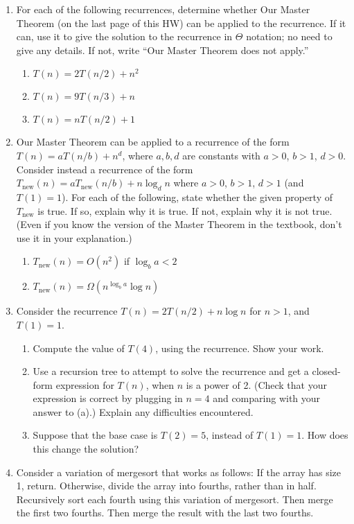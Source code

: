 \documentclass{article}
\begin{document}
\begin{enumerate}
    \item For each of the following recurrences, determine whether Our Master Theorem (on the last page of this HW) can be applied to the recurrence. If it can, use it to give the solution to the recurrence in $\Theta$ notation; no need to give any details. If not, write “Our Master Theorem does not apply.”
    \begin{enumerate}
        \item $T(n) = 2T(n/2) + n^2$
        \item $T(n) = 9T(n/3) + n$
        \item $T(n) = nT(n/2) + 1$
    \end{enumerate}
    \item Our Master Theorem can be applied to a recurrence of the form $T(n) = aT(n/b) + n^d$, where $a, b, d$ are constants with $a > 0$, $b > 1$, $d > 0$. Consider instead a recurrence of the form $T_{\text{new}}(n) = aT_{\text{new}}(n/b) + n \log_d n$ where $a > 0$, $b > 1$, $d > 1$ (and $T(1) = 1$).
    For each of the following, state whether the given property of $T_{\text{new}}$ is true. If so, explain why it is true. If not, explain why it is not true. (Even if you know the version of the Master Theorem in the textbook, don’t use it in your explanation.)
    \begin{enumerate}
        \item $T_{\text{new}}(n) = O(n^2)$ if $\log_b a < 2$
        \item $T_{\text{new}}(n) = \Omega(n^{\log_b a} \log n)$
    \end{enumerate}
    \item Consider the recurrence $T(n) = 2T(n/2) + n \log n$ for $n > 1$, and $T(1) = 1$.
    \begin{enumerate}
        \item Compute the value of $T(4)$, using the recurrence. Show your work.
        \item Use a recursion tree to attempt to solve the recurrence and get a closed-form expression for $T(n)$, when $n$ is a power of 2. (Check that your expression is correct by plugging in $n = 4$ and comparing with your answer to (a).)  Explain any difficulties encountered.
        \item Suppose that the base case is $T(2) = 5$, instead of $T(1) = 1$.  How does this change the solution?
    \end{enumerate}
    \item Consider a variation of mergesort that works as follows: If the array has size 1, return. Otherwise, divide the array into fourths, rather than in half. Recursively sort each fourth using this variation of mergesort. Then merge the first two fourths. Then merge the result with the last two fourths.

\end{enumerate}
\end{document}
